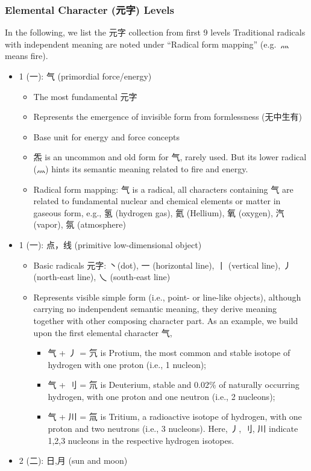 \subsubsection{Elemental Character (元字)
Levels}\label{elemental-character-ux5143ux5b57-levels}

In the following, we list the 元字 collection from first 9 levels
Traditional radicals with independent meaning are noted under ``Radical
form mapping'' (e.g.~灬 means fire).

\begin{itemize}
\tightlist
\item
  1 (一): 气 (primordial force/energy)

  \begin{itemize}
  \tightlist
  \item
    The most fundamental 元字
  \item
    Represents the emergence of invisible form from formlessness
    (无中生有)
  \item
    Base unit for energy and force concepts
  \item
    炁 is an uncommon and old form for 气, rarely used. But its lower
    radical (灬) hints its semantic meaning related to fire and energy.
  \item
    Radical form mapping: 气 is a radical, all characters containing 气
    are related to fundamental nuclear and chemical elements or matter
    in gaseous form, e.g., 氢 (hydrogen gas), 氦 (Hellium), 氧 (oxygen),
    汽 (vapor), 氛 (atmosphere)
  \end{itemize}
\item
  1 (一): 点，线 (primitive low-dimensional object)

  \begin{itemize}
  \tightlist
  \item
    Basic radicals 元字: 丶(dot), 一 (horizontal line), 丨 (vertical
    line), 丿 (north-east line), 乀 (south-east line)
  \item
    Represents visible simple form (i.e., point- or line-like objects),
    although carrying no indenpendent semantic meaning, they derive
    meaning together with other composing character part. As an example,
    we build upon the first elemental character 气,

    \begin{itemize}
    \tightlist
    \item
      气 + 丿 = 氕 is Protium, the most common and stable isotope of
      hydrogen with one proton (i.e., 1 nucleon);
    \item
      气 + 刂 = 氘 is Deuterium, stable and 0.02\% of naturally
      occurring hydrogen, with one proton and one neutron (i.e., 2
      nucleons);
    \item
      气 + 川 = 氚 is Tritium, a radioactive isotope of hydrogen, with
      one proton and two neutrons (i.e., 3 nucleons). Here, 丿, 刂, 川
      indicate 1,2,3 nucleons in the respective hydrogen isotopes.
    \end{itemize}
  \end{itemize}
\item
  2 (二): 日,月 (sun and moon)


\end{itemize}
